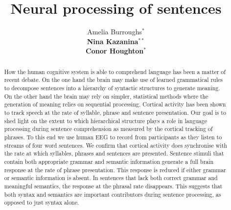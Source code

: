 \documentclass[a4paper,10pt,twoside]{article}
\begin{document}
\title{Neural processing of sentences}

\author{Amelia Burroughs$^*$ \\
{\normalsize \bf Nina Kazanina}$^{**}$ \\
{\normalsize \bf Conor Houghton}$^*$ 
\AND {}
\AND {} }


\maketitle\thispagestyle{empty} %

\begin{abstract}

How the human cognitive system is able to comprehend language has been
a matter of recent debate. 
%
%
On the one hand the brain may make use of
learned grammatical rules to decompose sentences into a hierarchy of
syntactic structures to generate meaning. On the other hand the brain
may rely on simpler, statistical methods where the generation of
meaning relies on sequential processing. 
%
%
Cortical activity has been
shown to track speech at the rate of syllable, phrase and sentence
presentation. 
%
%
Our goal
is to shed light on the extent to which hierarchical structure plays a role in language processing during sentence comprehension as measured by the cortical tracking of phrases. To this end we use human EEG to record from participants as they listen to streams of four word sentences. 
%
%
We confirm that cortical activity does synchronise with the rate at which syllables, phrases and sentences
are presented. 
%
%
Sentence stimuli that contain both appropriate grammar
and semantic information generate a full brain response at the rate of
phrase presentation. This response is reduced if either grammar or
semantic information is absent. In sentences that lack both correct
grammar and meaningful semantics, the response at the phrasal rate
disappears. 
%
%
This suggests that both syntax and semantics are important
contributors during sentence processing, as opposed to just syntax
alone. 
%

\end{abstract}
\end{document}
